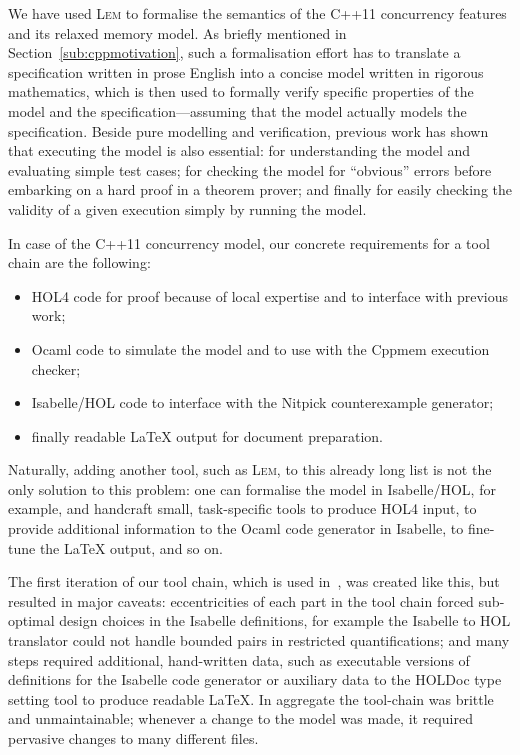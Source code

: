 \documentclass[a4paper]{llncs}
\newcommand{\Lem}{\textsc{Lem}}
\begin{document}
We have used \Lem{} to formalise the semantics of the C++11 concurrency
features and its relaxed memory model. As briefly mentioned in
Section~\ref{sub:cppmotivation}, such a formalisation effort has to translate a
specification written in prose English into a concise model written in rigorous
mathematics, which is then used to formally verify specific properties of the
model and the specification---assuming that the model actually models the
specification. Beside pure modelling and verification, previous work has shown
that executing the model is also essential: for understanding the model and
evaluating simple test cases; for checking the model for ``obvious'' errors
before embarking on a hard proof in a theorem prover; and finally for easily
checking the validity of a given execution simply by running the model. 

In case of the C++11 concurrency model, our concrete requirements for a tool
chain are the following:
\begin{itemize}
  \item HOL4 code for proof because of local expertise and to interface with
    previous work;
  \item Ocaml code to simulate the model and to use with the {\sc Cppmem}
    execution checker;
  \item Isabelle/HOL code to interface with the Nitpick counterexample generator;
  \item finally readable \LaTeX{} output for document preparation.
\end{itemize}
\noindent Naturally, adding another tool, such as \Lem{}, to this already long
list is not the only solution to this problem: one can
formalise the model in Isabelle/HOL, for example, and handcraft small,
task-specific tools to produce HOL4 input, to provide additional information to
the Ocaml code generator in Isabelle, to fine-tune the \LaTeX{} output, and so on.

The first iteration of our tool chain, which is used in~\cite{C++}, was created
like this, but resulted in major caveats: eccentricities of each part in the
tool chain forced sub-optimal design choices in the Isabelle definitions, for
example the Isabelle to HOL translator could not handle bounded pairs in
restricted quantifications; and many steps required additional, hand-written
data, such as executable versions of definitions for the Isabelle code generator
or auxiliary data to the HOLDoc type setting tool to produce readable \LaTeX{}.
In aggregate the tool-chain was brittle and unmaintainable; whenever a change to
the model was made, it required pervasive changes to many different files.
\end{document}
